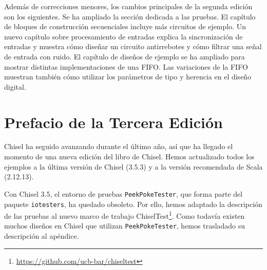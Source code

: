 \documentclass[%
    10pt,
    headinclude, footinclude=false,
    openright, %
    notitlepage,
    cleardoublepage=empty,
    headsepline,
    numbers=noenddot,
    bibliography=totoc, index=totoc,
    ]{scrbook}
\newcommand{\code}[1]{{\lstinline[basicstyle=\small\ttfamily]{#1}}}
\newcommand{\myref}[2]{\href{#1}{#2}}
\renewcommand{\myref}[2]{{#2}{\footnote{\url{#1}}}}
\begin{document}
Además de correcciones menores, los cambios principales de la segunda edición son los siguientes. 
Se ha ampliado la sección dedicada a las pruebas. El capítulo de bloques de construcción secuenciales incluye 
más circuitos de ejemplo. Un nuevo capítulo sobre procesamiento de entradas explica la sincronización de entradas y 
muestra cómo diseñar un circuito antirrebotes y cómo filtrar una señal de entrada con ruido. El capítulo de diseños 
de ejemplo se ha ampliado para mostrar distintas implementaciones de una FIFO. Las variaciones de la FIFO muestran 
también cómo utilizar los parámetros de tipo y herencia en el diseño digital.

\section*{Prefacio de la Tercera Edición}


Chisel ha seguido avanzando durante el último año, así que ha llegado el momento de una nueva edición del libro de 
Chisel. Hemos actualizado todos los ejemplos a la última versión de Chisel (3.5.3) y a la versión recomendada de 
Scala (2.12.13).


Con Chisel 3.5, el entorno de pruebas \code{PeekPokeTester}, que forma parte del paquete \code{iotesters}, 
ha quedado obsoleto. Por ello, hemos adaptado la descripción de las pruebas al nuevo marco de trabajo 
\myref{https://github.com/ucb-bar/chiseltest}{ChiselTest}. Como todavía existen muchos diseños en Chisel que 
utilizan \code{PeekPokeTester}, hemos trasladado su descripción al apéndice.

\end{document}
